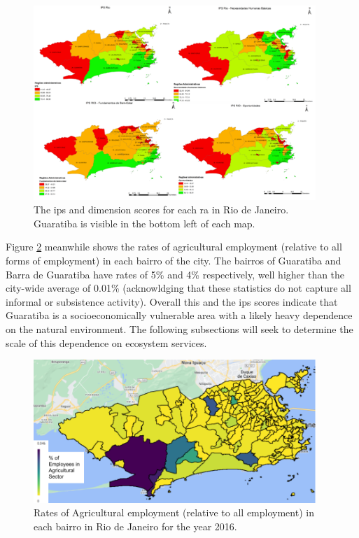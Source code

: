 \begin{figure}[!htb] 
\centering
\includegraphics[width=0.95\textwidth]{Figures/chap4/ips_maps.png}
\caption[Map of Social Progress Indicator for Rio de Janeiro]{The \acf{ips} and dimension scores for each \ac{ra} in Rio de Janeiro. Guaratiba is visible in the bottom left of each map.}
\label{fig:ips_maps}
\end{figure}

Figure \ref{fig:agriculture_employment} meanwhile shows the rates of agricultural employment (relative to all forms of employment) in each bairro of the city. The bairros of Guaratiba and Barra de Guaratiba have rates of 5\% and 4\% respectively, well higher than the city-wide average of 0.01\% (acknowldging that these statistics do not capture all informal or subsistence activity). Overall this and the \ac{ips} scores indicate that Guaratiba is a socioeconomically vulnerable area with a likely heavy dependence on the natural environment. The following subsections will seek to determine the scale of this dependence on ecosystem services.

\begin{figure}[!htb] 
\centering
\includegraphics[width=0.95\textwidth]{Figures/chap4/agriculture_employment.png}
\caption[Agricultural Employment Across Rio de Janeiro]{Rates of Agricultural employment (relative to all employment) in each bairro in Rio de Janeiro for the year 2016.}
\label{fig:agriculture_employment}
\end{figure}

